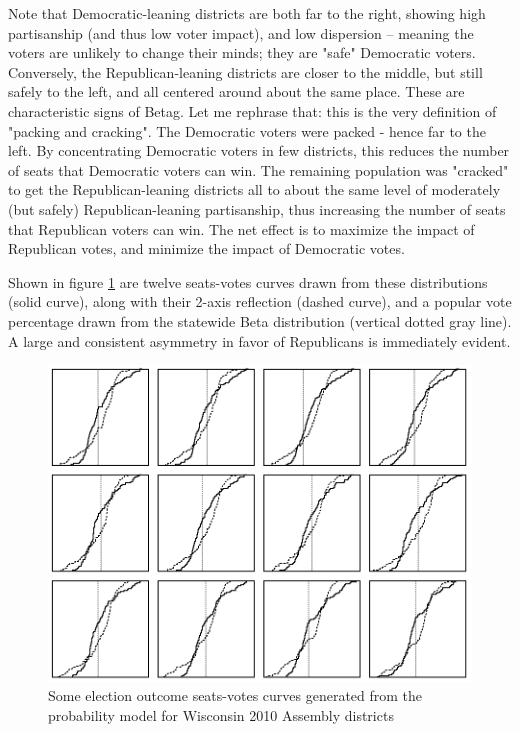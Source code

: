 \documentclass[preprint,12pt]{article}
\begin{document}
Note that Democratic-leaning districts are both far to the right, showing high partisanship (and thus low voter impact), and low dispersion -- meaning the voters are unlikely to change their minds; they are "safe" Democratic voters.  Conversely, the Republican-leaning districts are closer to the middle, but still safely to the left, and all centered around about the same place.   These are characteristic signs of Betag.  Let me rephrase that: this is the very definition of "packing and cracking".  The Democratic voters were packed - hence far to the left.  By concentrating Democratic voters in few districts, this reduces the number of seats that Democratic voters can win.  The remaining population was "cracked" to get the Republican-leaning districts all to about the same level of moderately (but safely) Republican-leaning partisanship, thus increasing the number of seats that Republican voters can win.  The net effect is to maximize the impact of Republican votes, and minimize the impact of Democratic votes.
 
Shown in figure \ref{fig:SVAssembly} are twelve seats-votes curves drawn from these distributions (solid curve), along with their 2-axis reflection (dashed curve), and a popular vote percentage drawn from the statewide Beta distribution (vertical dotted gray line).  A large and consistent asymmetry in favor of Republicans is immediately evident.

\begin{figure}[htb!]
    \begin{center}
        \includegraphics[scale=0.5]{../Figures/WI2010/sv_curves_assembly.png}
        \caption{Some election outcome seats-votes curves generated from the probability model for Wisconsin 2010 Assembly districts}\label{fig:SVAssembly}
    \end{center}
\end{figure}
\end{document}

